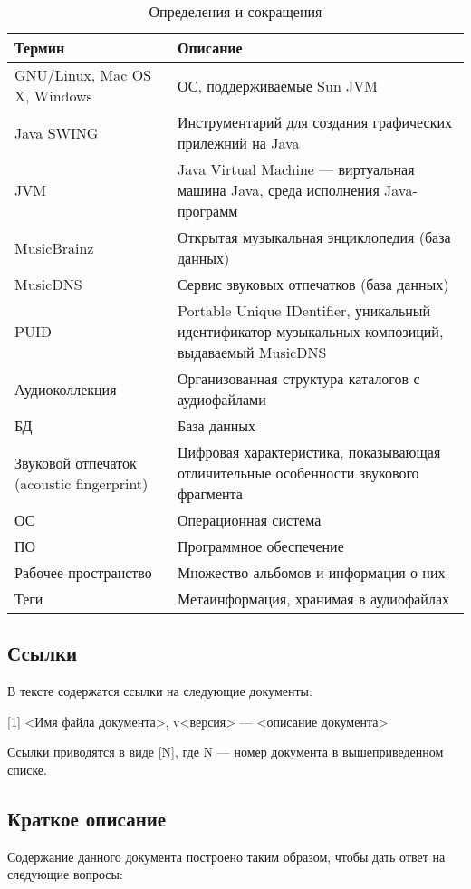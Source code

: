 \documentclass[pdftex,12pt,a4paper]{report}
\begin{document}
\begin{table}[h]  %
\caption{Определения и сокращения}
\begin{tabular}{|p{4cm}|p{10cm}|} \hline
Термин & Описание \\ \hline
GNU/Linux, Mac OS X, Windows & ОС, поддерживаемые Sun JVM \\ \hline
Java SWING & Инструментарий для создания графических прилежний на Java \\ \hline
JVM & Java Virtual Machine --- виртуальная машина Java, среда исполнения Java-программ \\ \hline
MusicBrainz & Открытая музыкальная энциклопедия (база данных) \\ \hline
MusicDNS    & Сервис звуковых отпечатков (база данных) \\ \hline
PUID & Portable Unique IDentifier, уникальный идентификатор музыкальных композиций, выдаваемый MusicDNS \\ \hline
Аудиоколлекция & Организованная структура каталогов с аудиофайлами \\ \hline
БД & База данных \\ \hline
Звуковой отпечаток (acoustic fingerprint) & Цифровая характеристика, показывающая отличительные особенности звукового фрагмента \\ \hline
ОС & Операционная система \\ \hline
ПО & Программное обеспечение \\ \hline
Рабочее пространство & Множество альбомов и информация о них \\ \hline
Теги & Метаинформация, хранимая в аудиофайлах \\ \hline
\end{tabular}
\end{table}

\subsection{Ссылки}
В тексте содержатся ссылки на следующие документы:

[1]	<Имя файла документа>, v<версия> --- <описание документа>

Ссылки приводятся в виде [N], где N --- номер документа в вышеприведенном списке.

\subsection{Краткое описание}
Содержание данного документа построено таким образом, чтобы дать ответ на следующие вопросы:
\end{document}
